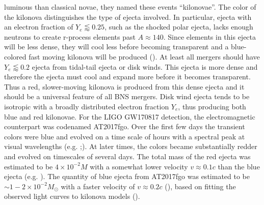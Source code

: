 luminous than classical novae, they named these events “kilonovae”.  The color of the kilonova distinguishes the type of ejecta involved. In particular, ejecta with an electron fraction of $Y_e \lessapprox 0.25$, such as the shocked polar ejecta, lacks enough neutrons to create r-process elements past $A \approx 140$. Since elements in this ejecta will be less dense, they will cool less before becoming transparent and a blue-colored fast moving kilonova will be produced (\citet*{metzger2014}). At least all mergers should have $Y_e \lessapprox 0.2$ ejecta from tidal-tail ejecta or disk winds. This ejecta is more dense and therefore the ejecta must cool and expand more before it becomes transparent. Thus a red, slower-moving kilonova is produced from this dense ejecta and it should be a universal feature of all BNS mergers. Disk wind ejecta tends to be isotropic with a broadly distributed electron fraction $Y_e$, thus producing both blue and red kilonovae. For the LIGO GW170817 detection, the electromagnetic counterpart was codenamed AT2017fgo. Over the first few days the transient colors were blue and evolved on a time scale of hours with a spectral peak at visual wavelengths (e.g. \cite{2017apj...848l..16s,2017apj...848l..18n,2017apj...848l..32m,cowperthwaite:2017dyu};). At later times, the colors became substantially redder and evolved on timescales of several days. The total mass of the red ejecta was estimated to be $4 \times 10^{-2} M$ with a somewhat lower velocity $v \approx 0.1 c$ than the blue ejecta (e.g. \citet*{cowperthwaite:2017dyu,2017apj...848l..19c,2017apj...848l..18n}). The quantity of blue ejecta from AT2017fgo was estimated to be $\sim 1-2 \times 10^{-2}M_\odot$
with a faster velocity of $v \approx 0.2 c$ (\citet*{cowperthwaite:2017dyu,2017apj...848l..18n}), based on fitting the observed light curves to kilonova models (\citet*{metzger2017}). 


